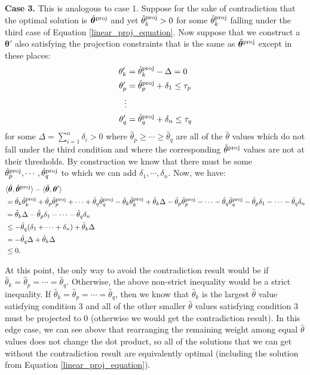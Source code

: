 \documentclass{article} %
\newcommand{\bmthproj}{\hat{\bm{\theta}}^{\textnormal{proj}}}
\newcommand{\thproj}{\hat{\theta}^{\textnormal{proj}}}
\begin{document}
\textbf{Case 3.}
This is analogous to case 1. Suppose for the sake of contradiction that the optimal solution is $\bmthproj$ and yet $\thproj_k > 0$ for some $\thproj_k$ falling under the third case of Equation \ref{linear_proj_equation}. Now suppose that we construct a $\bm{\theta}'$ also satisfying the projection constraints that is the same as $\bmthproj$ except in these places:
\begin{align*}
\theta'_k &= \thproj_k - \Delta = 0\\
\theta'_p &= \thproj_p + \delta_1 \leq \tau_p\\
\vdots\\
\theta'_q &= \thproj_q + \delta_n \leq \tau_q\\
\end{align*}
for some $\Delta=\sum_{i=1}^n \delta_i >0$ where $\hat{\theta}_p \geq \cdots \geq \hat{\theta}_q$ are all of the $\hat{\theta}$ values which do not fall under the third condition and where the corresponding $\thproj$ values are not at their thresholds. By construction we know that there must be some $\thproj_p, \cdots, \thproj_q$ to which we can add $\delta_1, \cdots, \delta_n$. Now, we have:
\begin{align*}
&\langle \hat{\bm{\theta}}, \bmthproj \rangle - \langle \hat{\bm{\theta}}, \bm{\theta}' \rangle\\
&= \hat{\theta}_k\thproj_k + \hat{\theta}_p\thproj_p + \cdots + \hat{\theta}_q\thproj_q - \hat{\theta}_k\thproj_k + \hat{\theta}_k\Delta -\hat{\theta}_p\thproj_p - \cdots - \hat{\theta}_q\thproj_q - \hat{\theta}_p\delta_1 - \cdots - \hat{\theta}_q\delta_n\\
&= \hat{\theta}_k\Delta - \hat{\theta}_p\delta_1 - \cdots - \hat{\theta}_q\delta_n\\
&\leq -\hat{\theta}_q(\delta_1+\cdots+\delta_n) + \hat{\theta}_k\Delta\\
&=-\hat{\theta}_q\Delta + \hat{\theta}_k\Delta\\
&\leq 0.
\end{align*}

At this point, the only way to avoid the contradiction result would be if $\hat{\theta}_k=\hat{\theta}_p=\cdots=\hat{\theta}_q$. Otherwise, the above non-strict inequality would be a strict inequality. If $\hat{\theta}_k=\hat{\theta}_p=\cdots=\hat{\theta}_q$, then we know that $\hat{\theta}_k$ is the largest $\hat{\theta}$ value satisfying condition 3 and all of the other smaller $\hat{\theta}$ values satisfying condition 3 must be projected to 0 (otherwise we would get the contradiction result). In this edge case, we can see above that rearranging the remaining weight among equal $\hat{\theta}$ values does not change the dot product, so all of the solutions that we can get without the contradiction result are equivalently optimal (including the solution from Equation \ref{linear_proj_equation}).
\end{document}
